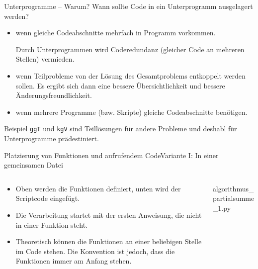 \documentclass[xelatex,aspectratio=169]{beamer}
\begin{document}
\begin{frame}{Unterprogramme -- Warum?}
  Wann sollte Code in ein Unterprogramm ausgelagert werden?
  \begin{itemize}
    \item wenn gleiche Codeabschnitte mehrfach in Programm vorkommen.

          Durch Unterprogrammen wird Coderedundanz (gleicher Code an mehreren Stellen) vermieden.
    \item wenn Teilprobleme von der Lösung des Gesamtproblems entkoppelt werden sollen. Es ergibt sich dann eine bessere Übersichtlichkeit und bessere Änderungsfreundlichkeit.
    \item wenn mehrere Programme (bzw. Skripte) gleiche Codeabschnitte benötigen.
  \end{itemize}

  \begin{exampleblock}{Beispiel}
    \texttt{ggT} und \texttt{kgV} sind Teillösungen für andere Probleme und deshabl für Unterprogramme prädestiniert.
  \end{exampleblock}

\end{frame}

\begin{frame}{Platzierung von Funktionen und aufrufendem Code}{Variante I: In einer gemeinsamen Datei}
  \vspace{-\baselineskip}
  \begin{columns}
    \begin{column}{.5\linewidth}
      \begin{itemize}
        \item Oben werden die Funktionen definiert, unten wird der Scriptcode eingefügt.

        \item Die Verarbeitung startet mit der ersten Anweisung, die nicht in einer Funktion steht.

        \item Theoretisch können die Funktionen an einer beliebigen Stelle im Code stehen. Die Konvention ist jedoch, dass die Funktionen immer am Anfang stehen.
      \end{itemize}
    \end{column}
    \begin{column}{.5\linewidth}
      \begin{listing}
        \small
        \caption{algorithmus\_partialsumme\_1.py}
        \inputminted{python}{src/algorithmus_partialsumme_1.py}
      \end{listing}
    \end{column}
  \end{columns}
\end{frame}
\end{document}
